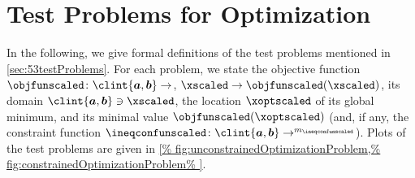 \chapter{Test Problems for Optimization}
\label{chap:a20testProblems}

In the following, we give formal definitions of the test problems
mentioned in \cref{sec:53testProblems}.
For each problem, we state the objective function
$\objfunscaled\colon \clint{\*a, \*b} \to \real$,
$\xscaled \to \objfunscaled(\xscaled)$,
its domain $\clint{\*a, \*b} \ni \xscaled$,
the location $\xoptscaled$ of its global minimum, and
its minimal value $\objfunscaled(\xoptscaled)$
(and, if any, the constraint function
$\ineqconfunscaled\colon \clint{\*a, \*b} \to \real^{m_{\ineqconfunscaled}}$).
Plots of the test problems are given in
\cref{%
  fig:unconstrainedOptimizationProblem,%
  fig:constrainedOptimizationProblem%
}.

{
  \newcommand*{\centertestfunline}[1]{%
    \mathclap{\hphantom{\mathrm{(B.99a)}}#1}%
  }
  
  
  
}

\cleardoublepage
